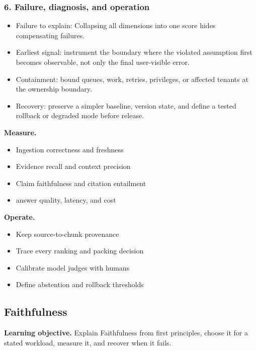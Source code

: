 \subsubsection*{6. Failure, diagnosis, and operation}
\begin{itemize}
\item Failure to explain: Collapsing all dimensions into one score hides compensating failures.
\item Earliest signal: instrument the boundary where the violated assumption first becomes observable, not only the final user-visible error.
\item Containment: bound queues, work, retries, privileges, or affected tenants at the ownership boundary.
\item Recovery: preserve a simpler baseline, version state, and define a tested rollback or degraded mode before release.
\end{itemize}
\textbf{Measure.}\begin{itemize}
\item Ingestion correctness and freshness
\item Evidence recall and context precision
\item Claim faithfulness and citation entailment
\item answer quality, latency, and cost
\end{itemize}
\textbf{Operate.}\begin{itemize}
\item Keep source-to-chunk provenance
\item Trace every ranking and packing decision
\item Calibrate model judges with humans
\item Define abstention and rollback thresholds
\end{itemize}
\subsection{Faithfulness}
\textbf{Learning objective.} Explain Faithfulness from first principles, choose it for a stated workload, measure it, and recover when it fails.
